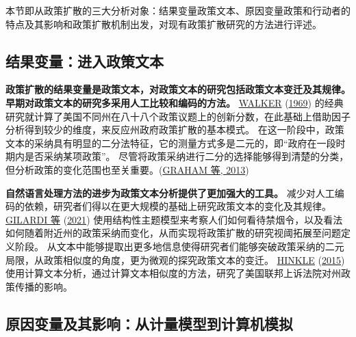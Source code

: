 \documentclass[
  12pt,
]{ctexart}
\begin{document}
本节即从政策扩散的三大分析对象：结果变量政策文本、原因变量政策和行动者的特点及其影响和政策扩散机制出发，对现有政策扩散研究的方法进行评述。

\hypertarget{ux7ed3ux679cux53d8ux91cfux8fdbux5165ux653fux7b56ux6587ux672c}{%
\subsection{结果变量：进入政策文本}\label{ux7ed3ux679cux53d8ux91cfux8fdbux5165ux653fux7b56ux6587ux672c}}

\textbf{政策扩散的结果变量是政策文本，对政策文本的研究包括政策文本变迁及其规律。}
\textbf{早期对政策文本的研究多采用人工比较和编码的方法。}
\protect\hyperlink{ref-Walker1969}{WALKER} (\protect\hyperlink{ref-Walker1969}{1969}) 的经典研究就计算了美国不同州在八十八个政策议题上的创新分数，在此基础上借助因子分析得到较少的维度，来反应州政府政策扩散的基本模式。
在这一阶段中，政策文本的采纳具有明显的二分法特征，它的测量方式多是二元的，即``政府在一段时期内是否采纳某项政策''。
尽管将政策采纳进行二分的选择能够得到清楚的分类，但分析政策的变化范围也至关重要。(\protect\hyperlink{ref-GrahamEtAl2013}{GRAHAM 等, 2013})

\textbf{自然语言处理方法的进步为政策文本分析提供了更加强大的工具。}
减少对人工编码的依赖，研究者们得以在更大规模的基础上研究政策文本的变化及其规律。
\protect\hyperlink{ref-GilardiEtAl2021}{GILARDI 等} (\protect\hyperlink{ref-GilardiEtAl2021}{2021}) 使用结构性主题模型来考察人们如何看待禁烟令，以及看法如何随着附近州的政策采纳而变化，从而实现将政策扩散的研究视阈拓展至问题定义阶段。
从文本中能够提取出更多地信息使得研究者们能够突破政策采纳的二元局限，从政策相似度的角度，更为微观的探究政策文本的变迁。
\protect\hyperlink{ref-Hinkle2015}{HINKLE} (\protect\hyperlink{ref-Hinkle2015}{2015}) 使用计算文本分析，通过计算文本相似度的方法，研究了美国联邦上诉法院对州政策传播的影响。

\hypertarget{ux539fux56e0ux53d8ux91cfux53caux5176ux5f71ux54cdux4eceux8ba1ux91cfux6a21ux578bux5230ux8ba1ux7b97ux673aux6a21ux62df}{%
\subsection{原因变量及其影响：从计量模型到计算机模拟}\label{ux539fux56e0ux53d8ux91cfux53caux5176ux5f71ux54cdux4eceux8ba1ux91cfux6a21ux578bux5230ux8ba1ux7b97ux673aux6a21ux62df}}
\end{document}

